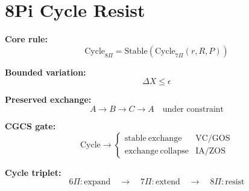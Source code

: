 \section*{8Pi Cycle Resist}

\textbf{Core rule:}
\[
\mathrm{Cycle}_{8\Pi}
=
\mathrm{Stable}\left(\mathrm{Cycle}_{7\Pi}(r,R,P)\right)
\]

\textbf{Bounded variation:}
\[
\Delta X \leq \epsilon
\]

\textbf{Preserved exchange:}
\[
A \rightarrow B \rightarrow C \rightarrow A
\quad \text{under constraint}
\]

\textbf{CGCS gate:}
\[
\mathrm{Cycle} \rightarrow
\begin{cases}
\mathrm{stable\ exchange} & \text{VC/GOS} \\
\mathrm{exchange\ collapse} & \text{IA/ZOS}
\end{cases}
\]

\textbf{Cycle triplet:}
\[
6\Pi:\mathrm{expand}
\quad\rightarrow\quad
7\Pi:\mathrm{extend}
\quad\rightarrow\quad
8\Pi:\mathrm{resist}
\]
